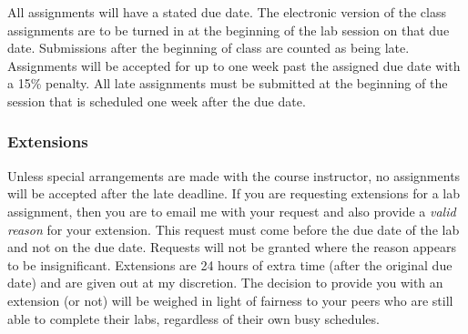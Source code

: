 \documentclass[11pt]{article} %
\begin{document}
All assignments will have a stated due date. \color{red} The electronic version of the class assignments are to be turned in at the beginning of the lab session on that due date. Submissions after the beginning of class are counted as being late. \color{black}  Assignments will be accepted for up to one week past the assigned due date with a 15\% penalty. All late assignments must be submitted at the beginning of the session that is scheduled one week after the due date. 

  
  \subsubsection*{\textbf{Extensions}}
Unless special arrangements are made with the course instructor, no assignments will be accepted after the late deadline. If you are requesting extensions for a lab assignment, then you are to email me with your request and also provide a \emph{valid reason} for your extension. This request must come before the due date of the lab and not on the due date. Requests will not be granted where the reason appears to be insignificant. Extensions are 24 hours of extra time (after the original due date) and are given out at my discretion. The decision to provide you with an extension (or not) will be weighed in light of fairness to your peers who are still able to complete their labs, regardless of their own busy schedules. 


\end{document}
